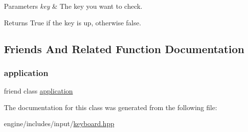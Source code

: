 \begin{DoxyParams}{Parameters}
{\em key} & The key you want to check. \\
\hline
\end{DoxyParams}
\begin{DoxyReturn}{Returns}
True if the key is up, otherwise false. 
\end{DoxyReturn}


\subsection{Friends And Related Function Documentation}
\mbox{\label{classmoka_1_1keyboard__state_a5b97104505447c42689b96b15027d832}} 
\subsubsection{\texorpdfstring{application}{application}}
{\footnotesize\ttfamily friend class \mbox{\hyperlink{classmoka_1_1application}{application}}\hspace{0.3cm}{\ttfamily [friend]}}



The documentation for this class was generated from the following file\+:\begin{DoxyCompactItemize}
\item 
engine/includes/input/\mbox{\hyperlink{keyboard_8hpp}{keyboard.\+hpp}}\end{DoxyCompactItemize}
